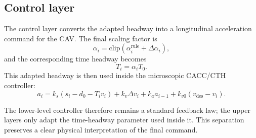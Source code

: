 \subsection{Control layer}

The control layer converts the adapted headway into a longitudinal acceleration command for the CAV. The final scaling factor is
\[
\alpha_i = \mathrm{clip}\!\left(\alpha_i^{\mathrm{rule}} + \Delta \alpha_i\right),
\]
and the corresponding time headway becomes
\[
T_i = \alpha_i T_0.
\]
This adapted headway is then used inside the microscopic CACC/CTH controller:
\[
a_i = k_s\left(s_i - d_0 - T_i v_i\right)
      + k_v \Delta v_i
      + k_a a_{i-1}
      + k_{v0}(v_{\mathrm{des}} - v_i).
\]

The lower-level controller therefore remains a standard feedback law; the upper layers only adapt the time-headway parameter used inside it. This separation preserves a clear physical interpretation of the final command.
